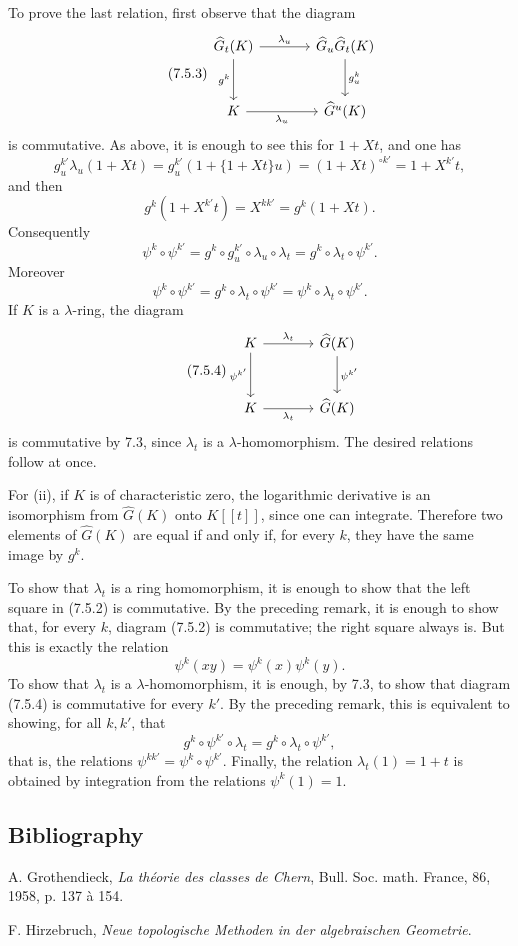 \documentclass[11pt]{article}
\begin{document}
To prove the last relation, first observe that the diagram
\begin{equation}\tag{7.5.3}
\begin{tikzcd}[column sep=large,row sep=large]
\widehat G_t(K) \arrow[r,"\lambda_u"] \arrow[d,"g^k"'] &
\widehat G_u\widehat G_t(K) \arrow[d,"g^k_u"]\\
K \arrow[r,"\lambda_u"'] &
\widehat G^u(K)
\end{tikzcd}
\end{equation}
is commutative. As above, it is enough to see this for \(1+Xt\), and one has
\[
  g^{k'}_u\lambda_u(1+Xt)
  =
  g^{k'}_u(1+\{1+Xt\}u)
  =
  (1+Xt)^{\circ k'}
  =
  1+X^{k'}t,
\]
and then
\[
  g^k(1+X^{k'}t)=X^{kk'}=g^k(1+Xt).
\]
Consequently
\[
  \psi^k\circ\psi^{k'}
  =
  g^k\circ g^{k'}_u\circ\lambda_u\circ\lambda_t
  =
  g^k\circ\lambda_t\circ\psi^{k'}.
\]
Moreover
\[
  \psi^k\circ\psi^{k'}
  =
  g^k\circ\lambda_t\circ\psi^{k'}
  =
  \psi^k\circ\lambda_t\circ\psi^{k'}.
\]
If \(K\) is a \(\lambda\)-ring, the diagram
\begin{equation}\tag{7.5.4}
\begin{tikzcd}[column sep=large,row sep=large]
K \arrow[r,"\lambda_t"] \arrow[d,"\psi^{k'}"'] &
\widehat G(K) \arrow[d,"\psi^{k'}"]\\
K \arrow[r,"\lambda_t"'] &
\widehat G(K)
\end{tikzcd}
\end{equation}
is commutative by 7.3, since \(\lambda_t\) is a \(\lambda\)-homomorphism. The desired relations follow at once.

For (ii), if \(K\) is of characteristic zero, the logarithmic derivative is an isomorphism from \(\widehat G(K)\) onto \(K[[t]]\), since one can integrate. Therefore two elements of \(\widehat G(K)\) are equal if and only if, for every \(k\), they have the same image by \(g^k\).

To show that \(\lambda_t\) is a ring homomorphism, it is enough to show that the left square in (7.5.2) is commutative. By the preceding remark, it is enough to show that, for every \(k\), diagram (7.5.2) is commutative; the right square always is. But this is exactly the relation
\[
  \psi^k(xy)=\psi^k(x)\psi^k(y).
\]
To show that \(\lambda_t\) is a \(\lambda\)-homomorphism, it is enough, by 7.3, to show that diagram (7.5.4) is commutative for every \(k'\). By the preceding remark, this is equivalent to showing, for all \(k,k'\), that
\[
  g^k\circ\psi^{k'}\circ\lambda_t
  =
  g^k\circ\lambda_t\circ\psi^{k'},
\]
that is, the relations \(\psi^{kk'}=\psi^k\circ\psi^{k'}\). Finally, the relation \(\lambda_t(1)=1+t\) is obtained by integration from the relations \(\psi^k(1)=1\).

\subsection*{Bibliography}
\begin{enumerate}[label={[\arabic*]}]
\item A. Grothendieck, \emph{La théorie des classes de Chern}, Bull. Soc. math. France, 86, 1958, p. 137 à 154.
\item F. Hirzebruch, \emph{Neue topologische Methoden in der algebraischen Geometrie}.
\end{enumerate}
\end{document}
